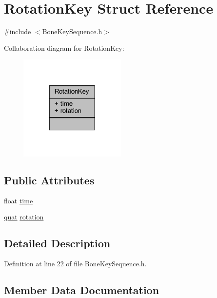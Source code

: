 \hypertarget{struct_rotation_key}{}\section{Rotation\+Key Struct Reference}
\label{struct_rotation_key}


{\ttfamily \#include $<$Bone\+Key\+Sequence.\+h$>$}



Collaboration diagram for Rotation\+Key\+:\nopagebreak
\begin{figure}[H]
\begin{center}
\leavevmode
\includegraphics[width=150pt]{struct_rotation_key__coll__graph}
\end{center}
\end{figure}
\subsection*{Public Attributes}
\begin{DoxyCompactItemize}
\item 
float \hyperlink{struct_rotation_key_a421ab28d247b062e4c46e4879943ee7d}{time}
\item 
\hyperlink{_types_8h_a02abcac728eae225e929e9e0dc427f28}{quat} \hyperlink{struct_rotation_key_a9638fbf119b41fd844b3d24c9e95d52d}{rotation}
\end{DoxyCompactItemize}


\subsection{Detailed Description}


Definition at line 22 of file Bone\+Key\+Sequence.\+h.



\subsection{Member Data Documentation}
